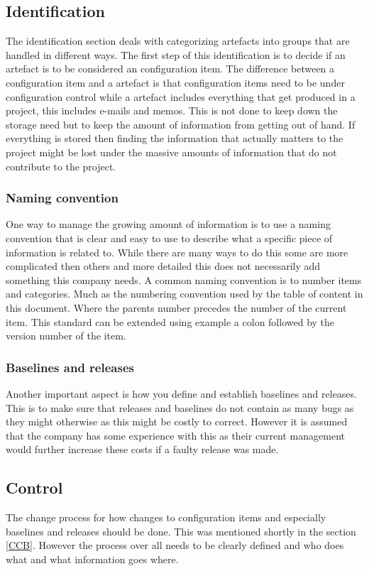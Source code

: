 \documentclass[a4paper]{article}
\begin{document}
\subsection{Identification}
The identification section deals with categorizing artefacts into groups that are handled in different ways. The first step of this identification is to decide if an artefact is to be considered an configuration item. The difference between a configuration item and a artefact is that configuration items need to be under configuration control while a artefact includes everything that get produced in a project, this includes e-mails and memos. This is not done to keep down the storage need but to keep the amount of information from getting out of hand. If everything is stored then finding the information that actually matters to the project might be lost under the massive amounts of information that do not contribute to the project.

\subsubsection{Naming convention}
One way to manage the growing amount of information is to use a naming convention that is clear and easy to use to describe what a specific piece of information is related to. While there are many ways to do this some are more complicated then others and more detailed this does not necessarily add something this company needs. A common naming convention is to number items and categories. Much as the numbering convention used by the table of content in this document. Where the parents number precedes the number of the current item. This standard can be extended using example a colon followed by the version number of the item.

\subsubsection{Baselines and releases}
Another important aspect is how you define and establish baselines and releases. This is to make sure that releases and baselines do not contain as many bugs as they might otherwise as this might be costly to correct. However it is assumed that the company has some experience with this as their current management would further increase these costs if a faulty release was made.

\subsection{Control}
The change process for how changes to configuration items and especially baselines and releases should be done. This was mentioned shortly in the section \ref{CCB}. However the process over all needs to be clearly defined and who does what and what information goes where.
\end{document}
